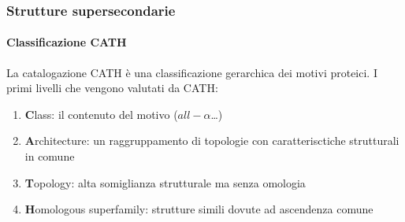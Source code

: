 \documentclass{beamer}
\begin{document}
\begin{frame}
 \frametitle{Strutture supersecondarie}
  \framesubtitle{Classificazione CATH}
La catalogazione CATH è una classificazione gerarchica dei motivi proteici.
\pause I primi livelli che vengono valutati da CATH:
\begin{enumerate}
 \item {\bf C}lass: il contenuto del motivo ($all-\alpha$\ldots)
\pause  \item {\bf A}rchitecture: un raggruppamento di topologie con caratterisctiche strutturali in comune 
\pause  \item {\bf T}opology: alta somiglianza strutturale ma senza omologia
\pause  \item {\bf H}omologous superfamily: strutture simili dovute ad ascendenza comune
\end{enumerate}
\pause {}
\end{frame}
\end{document}
